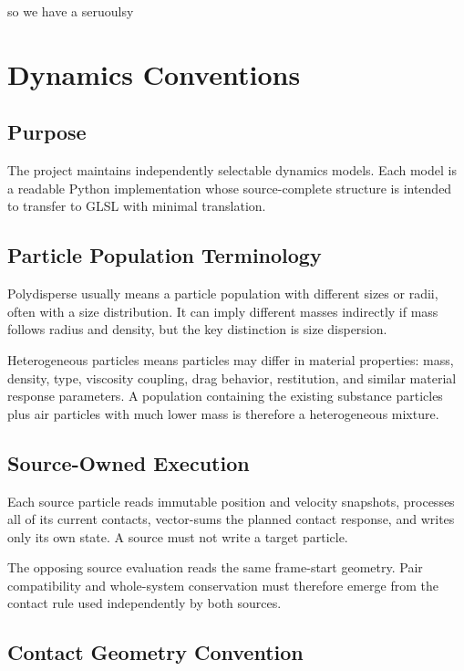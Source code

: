 so we have a seruoulsy 
\section{Dynamics Conventions}

\subsection{Purpose}

The project maintains independently selectable dynamics models.  Each model is
a readable Python implementation whose source-complete structure is intended
to transfer to GLSL with minimal translation.

\subsection{Particle Population Terminology}

Polydisperse usually means a particle population with different sizes or
radii, often with a size distribution.  It can imply different masses
indirectly if mass follows radius and density, but the key distinction is size
dispersion.

Heterogeneous particles means particles may differ in material properties:
mass, density, type, viscosity coupling, drag behavior, restitution, and
similar material response parameters.  A population containing the existing
substance particles plus air particles with much lower mass is therefore a
heterogeneous mixture.

\subsection{Source-Owned Execution}

Each source particle reads immutable position and velocity snapshots,
processes all of its current contacts, vector-sums the planned contact
response, and writes only its own state.  A source must not write a target
particle.

The opposing source evaluation reads the same frame-start geometry.  Pair
compatibility and whole-system conservation must therefore emerge from the
contact rule used independently by both sources.

\subsection{Contact Geometry Convention}

